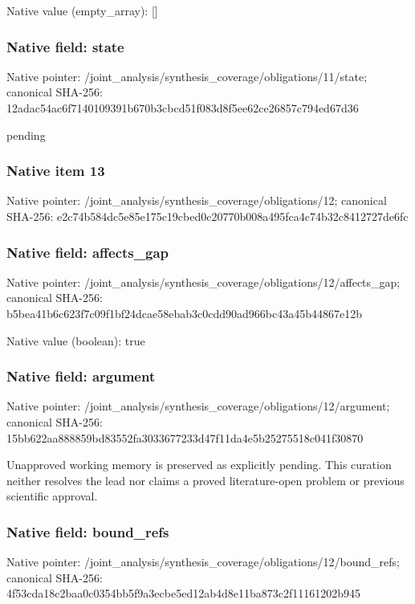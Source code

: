 \documentclass[10pt,a4paper]{article}
\begin{document}
Native value (empty\_\allowbreak{}array): []

\subsubsection{Native field: state}
Native pointer: /joint\_\allowbreak{}analysis/synthesis\_\allowbreak{}coverage/obligations/11/state; canonical SHA-256: 12adac54ac6f7140109391b670b3cbcd51f083d8f5ee62ce26857c794ed67d36

\begingroup\raggedright\sloppy pending\par\endgroup

\subsubsection{Native item 13}
Native pointer: /joint\_\allowbreak{}analysis/synthesis\_\allowbreak{}coverage/obligations/12; canonical SHA-256: e2c74b584dc5e85e175c19cbed0c20770b008a495fca4c74b32c8412727de6fc

\subsubsection{Native field: affects\_\allowbreak{}gap}
Native pointer: /joint\_\allowbreak{}analysis/synthesis\_\allowbreak{}coverage/obligations/12/affects\_\allowbreak{}gap; canonical SHA-256: b5bea41b6c623f7c09f1bf24dcae58ebab3c0cdd90ad966bc43a45b44867e12b

Native value (boolean): true

\subsubsection{Native field: argument}
Native pointer: /joint\_\allowbreak{}analysis/synthesis\_\allowbreak{}coverage/obligations/12/argument; canonical SHA-256: 15bb622aa888859bd83552fa3033677233d47f11da4e5b25275518c041f30870

\begingroup\raggedright\sloppy Unapproved working memory is preserved as explicitly pending. This curation neither resolves the lead nor claims a proved literature-open problem or previous scientific approval.\par\endgroup

\subsubsection{Native field: bound\_\allowbreak{}refs}
Native pointer: /joint\_\allowbreak{}analysis/synthesis\_\allowbreak{}coverage/obligations/12/bound\_\allowbreak{}refs; canonical SHA-256: 4f53cda18c2baa0c0354bb5f9a3ecbe5ed12ab4d8e11ba873c2f11161202b945
\end{document}
